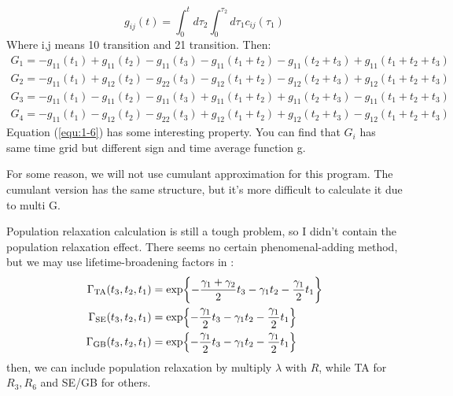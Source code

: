 \documentclass[12pt,a4paper,scale=1.0]{article}
\begin{document}
	 \begin{equation}\label{equ:1-5} 
	 g_{ij}(t) = \int_{0}^{t} d\tau_2 \int_{0}^{\tau_2} d\tau_1  c_{ij} ( \tau_1 )
	 \end{equation}
	 Where i,j means 10 transition and 21 transition. Then:
	 \begin{equation}\label{equ:1-6}
		\begin{aligned}	 
		G_1 = -g_{11}(t_1) + g_{11}(t_2)        - g_{11}(t_3)
		-g_{11}(t_1 + t_2) - g_{11}(t_2 + t_3)  + g_{11}(t_1 + t_2 +t_3) \\   
		G_2 = -g_{11}(t_1) + g_{12}(t_2)        - g_{22}(t_3)
		-g_{12}(t_1 + t_2) - g_{12}(t_2 + t_3)  + g_{12}(t_1 + t_2 +t_3) \\ 
		G_3 = -g_{11}(t_1) - g_{11}(t_2)        - g_{11}(t_3)
		+g_{11}(t_1 + t_2) + g_{11}(t_2 + t_3)  - g_{11}(t_1 + t_2 +t_3) \\
		G_4 = -g_{11}(t_1) - g_{12}(t_2)        - g_{22}(t_3)
		+g_{12}(t_1 + t_2) + g_{12}(t_2 + t_3)  - g_{12}(t_1 + t_2 +t_3) 
		\end{aligned}
	\end{equation}
	Equation (\ref{equ:1-6}) has some interesting property. You can find that $G_i$ has same time grid but different sign and time average function g. 
	
	For some reason, we will not use cumulant approximation for this program. The cumulant version has the same structure, but it's more difficult to calculate it due to multi G.
	
	Population relaxation calculation is  still a tough problem, so I didn't contain the population relaxation effect. There seems no certain phenomenal-adding method, but we may use lifetime-broadening factors in \cite{doi:10.1063/1.1633549}:
	\begin{equation}\label{equ:population relaxation}
	\begin{aligned}
	\Gamma_{\rm{TA}} (t_3,t_2,t_1) & = \exp{- \frac{\gamma_1+\gamma_2}{2} t_3 -
		\gamma_1 t_2 -   \frac{\gamma_1}{2} t_1  } \\
	\Gamma_{\rm{SE}} (t_3,t_2,t_1) & = \exp{- \frac{\gamma_1}{2} t_3 -
		\gamma_1 t_2 -   \frac{\gamma_1}{2} t_1  } \\
	\Gamma_{\rm{GB}} (t_3,t_2,t_1) & = \exp{- \frac{\gamma_1}{2} t_3 -
		\gamma_1 t_2 -   \frac{\gamma_1}{2} t_1  } \\
	\end{aligned}
	\end{equation}
	then, we can include population relaxation by multiply $\lambda$ with $R$, while TA for $R_3,R_6$ and SE/GB for others.  
	
\end{document}
